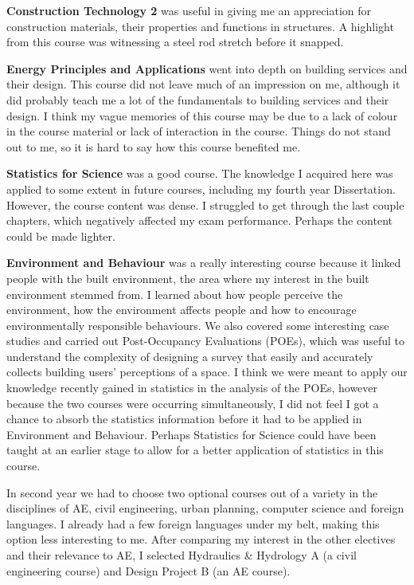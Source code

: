 \textbf{Construction Technology 2} was useful in giving me an appreciation for construction materials, their properties and functions in structures.
A highlight from this course was witnessing a steel rod stretch before it snapped.

\textbf{Energy Principles and Applications} went into depth on building services and their design.
This course did not leave much of an impression on me, although it did probably teach me a lot of the fundamentals to building services and their design.
I think my vague memories of this course may be due to a lack of colour in the course material or lack of interaction in the course.
Things do not stand out to me, so it is hard to say how this course benefited me.

\textbf{Statistics for Science} was a good course.
The knowledge I acquired here was applied to some extent in future courses, including my fourth year Dissertation.
However, the course content was dense.
I struggled to get through the last couple chapters, which negatively affected my exam performance.
Perhaps the content could be made lighter.

\textbf{Environment and Behaviour} was a really interesting course because it linked people with the built environment, the area where my interest in the built environment stemmed from.
I learned about how people perceive the environment, how the environment affects people and how to encourage environmentally responsible behaviours.
We also covered some interesting case studies and carried out Post-Occupancy Evaluations (POEs), which was useful to understand the complexity of designing a survey that easily and accurately collects building users' perceptions of a space.
I think we were meant to apply our knowledge recently gained in statistics in the analysis of the POEs, however because the two courses were occurring simultaneously, I did not feel I got a chance to absorb the statistics information before it had to be applied in Environment and Behaviour.
Perhaps Statistics for Science could have been taught at an earlier stage to allow for a better application of statistics in this course.



In second year we had to choose two optional courses out of a variety in the disciplines of AE, civil engineering, urban planning, computer science and foreign languages.
I already had a few foreign languages under my belt, making this option less interesting to me.
After comparing my interest in the other electives and their relevance to AE, I selected Hydraulics \& Hydrology A (a civil engineering course) and Design Project B (an AE course).

